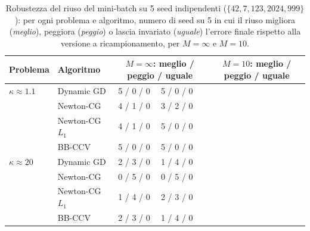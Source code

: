 



\begin{table}[H]

\centering

\footnotesize

\renewcommand{\arraystretch}{1.0}

\setlength{\tabcolsep}{2pt}

\caption{Robustezza del riuso del mini-batch su 5 seed indipendenti ($\{42,7,123,2024,999\}$): per ogni problema e algoritmo, numero di seed su 5 in cui il riuso migliora (\emph{meglio}), peggiora (\emph{peggio}) o lascia invariato (\emph{uguale}) l'errore finale rispetto alla versione a ricampionamento, per $M=\infty$ e $M=10$.}

\label{tab:riuso_robustezza}

\begin{tabular}{@{}llrrr|rrr@{}}

\toprule

Problema & Algoritmo & \multicolumn{3}{c}{$M=\infty$: meglio / peggio / uguale} & \multicolumn{3}{c}{$M=10$: meglio / peggio / uguale}\\

\midrule

$\kappa\approx1.1$ & Dynamic GD & 5 / 0 / 0 & 5 / 0 / 0\\

 & Newton-CG & 4 / 1 / 0 & 3 / 2 / 0\\

 & Newton-CG $L_1$ & 4 / 1 / 0 & 5 / 0 / 0\\

 & BB-CCV & 5 / 0 / 0 & 5 / 0 / 0\\

\midrule

$\kappa\approx20$ & Dynamic GD & 2 / 3 / 0 & 1 / 4 / 0\\

 & Newton-CG & 0 / 5 / 0 & 0 / 5 / 0\\

 & Newton-CG $L_1$ & 1 / 4 / 0 & 2 / 3 / 0\\

 & BB-CCV & 2 / 3 / 0 & 1 / 4 / 0\\

\midrule


\end{tabular}
\end{table}
